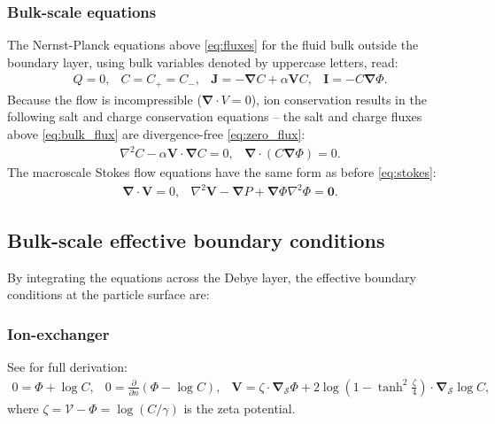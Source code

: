 \documentclass[10pt]{ijnam}
\newcommand{\deriv}[2]{\frac{\partial #1}{\partial #2}}
\newcommand{\pars}[1]{\left(#1\right)}
\newcommand\Laplacian{\nabla^2}
\newcommand\bnabla{\boldsymbol{\nabla}}
\newcommand\bV{\boldsymbol{V}}
\newcommand\bI{\boldsymbol{I}}
\newcommand\bJ{\boldsymbol{J}}
\newcommand\bzero{\boldsymbol{0}}
\newcommand\cV{\mathscr{V}}
\begin{document}
\subsubsection  {Bulk-scale equations}
The Nernst-Planck equations above \eqref{eq:fluxes} for the fluid bulk outside
the boundary layer, using bulk variables denoted by uppercase letters, read:
\begin{equation} \begin{array}{cccc} \label{eq:bulk_flux}
  Q = 0, &
  C = C_+ = C_-, &
\bJ = -\bnabla C + \alpha \bV C, &
\bI = -C \bnabla \varPhi.
\end{array}\end{equation}
Because the flow is incompressible ($\bnabla \cdot V = 0$), 
ion conservation results in the following 
salt and charge conservation equations -- the salt and charge fluxes above 
\eqref{eq:bulk_flux} are divergence-free
\eqref{eq:zero_flux}:
\begin{equation} \begin{array}{ccc}
\label{eq:salt_charge}
\Laplacian C - \alpha \bV \cdot \bnabla C = 0, &
\bnabla \cdot \pars{ C \bnabla \varPhi } = 0.
\end{array}\end{equation}
The macroscale Stokes flow equations have the same form as before \eqref{eq:stokes}:
\begin{equation}
\begin{array}{ccc}
\bnabla \cdot \bV = 0, &   
\Laplacian \bV - \bnabla P + \bnabla \varPhi \Laplacian \varPhi = \bzero.
\end{array}
\end{equation}

\subsection{Bulk-scale effective boundary conditions}
By integrating the equations across the Debye layer,
the effective boundary conditions at the particle surface are:
\subsubsection{Ion-exchanger} See \cite{yariv2010migration} for full derivation:
\begin{equation}
\begin{array}{ccc}
\label{eq:ionex_bnd}
0 = \varPhi + \log C, &
0 = \deriv{}{n} \pars{\varPhi - \log C}, &
\bV = 
\zeta \cdot \bnabla_\mathcal{S} \varPhi 
+ 2\log\pars{1-\tanh^2\frac{\zeta}{4}} \cdot \bnabla_\mathcal{S} \log C,
\end{array}\end{equation}
where $\zeta = \cV - \varPhi = \log (C / \gamma)$ 
is the zeta potential.
\end{document}
